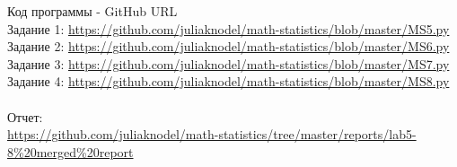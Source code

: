 Код программы - GitHub URL  \\
Задание 1: \url{https://github.com/juliaknodel/math-statistics/blob/master/MS5.py}\\
Задание 2: \url{https://github.com/juliaknodel/math-statistics/blob/master/MS6.py}\\
Задание 3: \url{https://github.com/juliaknodel/math-statistics/blob/master/MS7.py}\\
Задание 4: \url{https://github.com/juliaknodel/math-statistics/blob/master/MS8.py}\\
\\
Отчет:\\ \url{https://github.com/juliaknodel/math-statistics/tree/master/reports/lab5-8%20merged%20report}